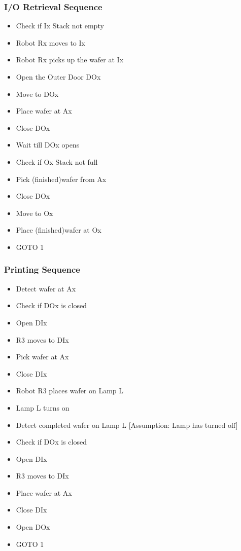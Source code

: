 \documentclass[a4paper,12pt]{article}
\begin{document}
\subsubsection {I/O Retrieval Sequence }
\begin{itemize}
\item Check if Ix Stack not empty
\item Robot Rx moves to Ix
\item Robot Rx picks up the wafer at Ix 
\item Open the Outer Door DOx
\item Move to DOx
\item Place wafer at Ax
\item Close DOx
\item Wait till DOx opens
\item Check if Ox Stack not full
\item Pick (finished)wafer from Ax
\item Close DOx
\item Move to Ox
\item Place (finished)wafer at Ox
\item GOTO 1
\end{itemize}

\subsubsection {Printing Sequence}
\begin{itemize}
\item Detect wafer at Ax
\item Check if DOx is closed
\item Open DIx
\item R3 moves to DIx
\item Pick wafer at Ax
\item Close DIx
\item Robot R3 places wafer on Lamp L
\item Lamp L turns on
\item Detect completed wafer on Lamp L [Assumption: Lamp has turned off]
\item Check if DOx is closed
\item Open DIx
\item R3 moves to DIx
\item Place wafer at Ax
\item Close DIx
\item Open DOx
\item GOTO 1
\end{itemize}
\end{document}
